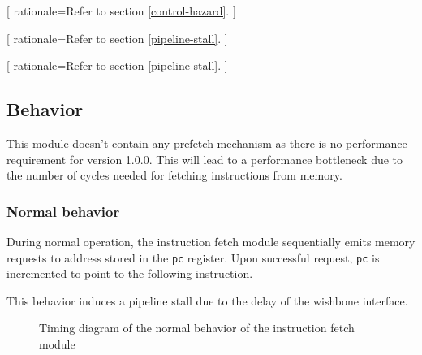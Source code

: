       [
          rationale=Refer to section \ref{control-hazard}.
        ]

      [
          rationale=Refer to section \ref{pipeline-stall}.
        ]

      [
          rationale=Refer to section \ref{pipeline-stall}.
        ]

  \subsection{Behavior}

    \begin{content}
        This module doesn't contain any prefetch mechanism as there is no performance requirement for version 1.0.0. This will lead to a performance bottleneck due to the number of cycles needed for fetching instructions from memory.
      \end{content}

    \subsubsection{Normal behavior}

      \begin{content}
          During normal operation, the instruction fetch module sequentially emits memory requests to address stored in the \texttt{pc} register. Upon successful request, \texttt{pc} is incremented to point to the following instruction.

          This behavior induces a pipeline stall due to the delay of the wishbone interface.
        \end{content}

      \begin{figure}[H]
          \centering
          
          \caption{Timing diagram of the normal behavior of the instruction fetch module}
          \label{fig:ifm-behavior-normal}
        \end{figure}

